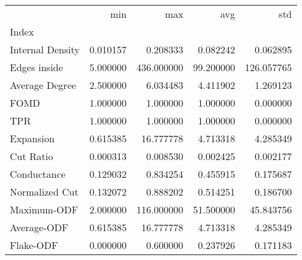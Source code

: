 \begin{tabular}{lrrrr}
\toprule
{} &       min &         max &        avg &         std \\
Index            &           &             &            &             \\
\midrule
Internal Density &  0.010157 &    0.208333 &   0.082242 &    0.062895 \\
Edges inside     &  5.000000 &  436.000000 &  99.200000 &  126.057765 \\
Average Degree   &  2.500000 &    6.034483 &   4.411902 &    1.269123 \\
FOMD             &  1.000000 &    1.000000 &   1.000000 &    0.000000 \\
TPR              &  1.000000 &    1.000000 &   1.000000 &    0.000000 \\
Expansion        &  0.615385 &   16.777778 &   4.713318 &    4.285349 \\
Cut Ratio        &  0.000313 &    0.008530 &   0.002425 &    0.002177 \\
Conductance      &  0.129032 &    0.834254 &   0.455915 &    0.175687 \\
Normalized Cut   &  0.132072 &    0.888202 &   0.514251 &    0.186700 \\
Maximum-ODF      &  2.000000 &  116.000000 &  51.500000 &   45.843756 \\
Average-ODF      &  0.615385 &   16.777778 &   4.713318 &    4.285349 \\
Flake-ODF        &  0.000000 &    0.600000 &   0.237926 &    0.171183 \\
\bottomrule
\end{tabular}
